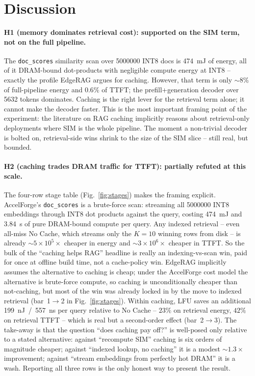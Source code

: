 \documentclass[11pt]{article}
\begin{document}
\section{Discussion}

\paragraph{H1 (memory dominates retrieval cost): supported on the SIM term, not on the full pipeline.}
The \texttt{doc\_scores} similarity scan over \num{5000000} INT8 docs is \SI{474}{\milli\joule} of
energy, all of it DRAM-bound dot-products with negligible compute energy at INT8 -- exactly the
profile EdgeRAG argues for caching. However, that term is only $\sim\!8\%$ of full-pipeline
energy and $0.6\%$ of TTFT; the prefill+generation decoder over \num{5632} tokens dominates.
Caching is the right lever for the retrieval term alone; it cannot make the decoder faster.
This is the most important framing point of the experiment: the literature on RAG caching
implicitly reasons about retrieval-only deployments where SIM is the whole pipeline. The
moment a non-trivial decoder is bolted on, retrieval-side wins shrink to the size of the
SIM slice -- still real, but bounded.

\paragraph{H2 (caching trades DRAM traffic for TTFT): partially refuted at this scale.}
The four-row stage table (Fig.~\ref{fig:stages}) makes the framing explicit. AccelForge's
\texttt{doc\_scores} is a brute-force scan: streaming all \num{5000000} INT8 embeddings
through INT8 dot products against the query, costing \SI{474}{\milli\joule} and \SI{3.84}{\second}
of pure DRAM-bound compute per query. Any indexed retrieval -- even all-miss No Cache, which
streams only the $K{=}10$ winning rows from disk -- is already $\sim\!5{\times}10^{5}\!\times$
cheaper in energy and $\sim\!3{\times}10^{6}\!\times$ cheaper in TTFT. So the bulk of the
``caching helps RAG'' headline is really an indexing-vs-scan win, paid for once at offline
build time, not a cache-policy win. EdgeRAG implicitly assumes the alternative to caching
is cheap; under the AccelForge cost model the alternative is brute-force compute, so caching
is unconditionally cheaper than not-caching, but most of the win was already locked in by the
move to indexed retrieval (bar~1$\to$2 in Fig.~\ref{fig:stages}). Within caching, LFU saves an
additional \SI{199}{\nano\joule}~/~\SI{557}{\nano\second} per query relative to No Cache --
$23\%$ on retrieval energy, $42\%$ on retrieval TTFT -- which is real but a second-order
effect (bar~2$\to$3). The take-away is that the question ``does caching pay off?'' is
well-posed only relative to a stated alternative: against ``recompute SIM'' caching is
six orders of magnitude cheaper; against ``indexed lookup, no caching'' it is a modest
$\sim\!1.3{\times}$ improvement; against ``stream embeddings from perfectly hot DRAM'' it
is a wash. Reporting all three rows is the only honest way to present the result.
\end{document}
